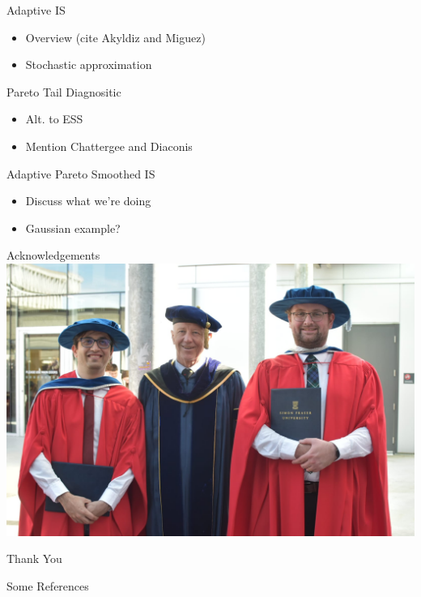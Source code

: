 \documentclass[14pt]{beamer}
\begin{document}
\begin{frame}{Adaptive IS}
    \begin{itemize}
        \item Overview (cite Akyldiz and Miguez)
        \item Stochastic approximation
    \end{itemize}
\end{frame}

\begin{frame}{Pareto Tail Diagnositic}
    \begin{itemize}
        \item Alt. to ESS
        \item Mention Chattergee and Diaconis
    \end{itemize}    
\end{frame}

\begin{frame}{Adaptive Pareto Smoothed IS}
    \begin{itemize}
        \item Discuss what we're doing
        \item Gaussian example?
    \end{itemize}
\end{frame}




\begin{frame}{Acknowledgements}
    \includegraphics[width=\textwidth]{Figures/Convocation Image.jpg}
\end{frame}

\begin{frame}
    \centering
    \Huge Thank You
\end{frame}

\begin{frame}{Some References}
    
    
\end{frame}
\end{document}

